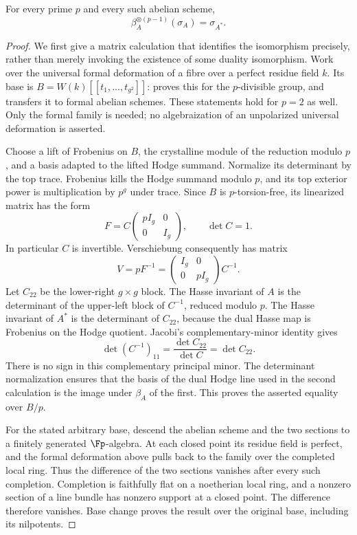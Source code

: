 \begin{theorem}\label{thm:DE-hasse}
For every prime $p$ and every such abelian scheme,
\[
                  \beta_A^{\otimes(p-1)}(\sigma_A)=\sigma_{A^*}.
\]
\end{theorem}
\begin{proof}
We first give a matrix calculation that identifies the isomorphism precisely, rather than merely invoking the existence of some duality isomorphism.  Work over the universal formal deformation of a fibre over a perfect residue field $k$.  Its base is
$B=W(k)[[t_1,\ldots,t_{g^2}]]$: \cite[Corollary~4.8(i)]{Illusie1985BT} proves this for the $p$-divisible group, and \cite[Theorem~1.2.1]{Katz1981ST} transfers it to formal abelian schemes.  These statements hold for $p=2$ as well.  Only the formal family is needed; no algebraization of an unpolarized universal deformation is asserted.

Choose a lift of Frobenius on $B$, the crystalline module of the reduction modulo $p$, and a basis adapted to the lifted Hodge summand.  Normalize its determinant by the top trace.  Frobenius kills the Hodge summand modulo $p$, and its top exterior power is multiplication by $p^g$ under trace.  Since $B$ is $p$-torsion-free, its linearized matrix has the form
\[
 F=C\begin{pmatrix}pI_g&0\\0&I_g\end{pmatrix},
 \qquad \det C=1.
\]
In particular $C$ is invertible.  Verschiebung consequently has matrix
\[
 V=pF^{-1}=\begin{pmatrix}I_g&0\\0&pI_g\end{pmatrix}C^{-1}.
\]
Let $C_{22}$ be the lower-right $g\times g$ block.  The Hasse invariant of $A$ is the determinant of the upper-left block of $C^{-1}$, reduced modulo $p$.  The Hasse invariant of $A^*$ is the determinant of $C_{22}$, because the dual Hasse map is Frobenius on the Hodge quotient.  Jacobi's complementary-minor identity gives
\[
             \det (C^{-1})_{11}=\frac{\det C_{22}}{\det C}
                             =\det C_{22}.
\]
There is no sign in this complementary principal minor.  The determinant normalization ensures that the basis of the dual Hodge line used in the second calculation is the image under $\beta_A$ of the first.  This proves the asserted equality over $B/p$.

For the stated arbitrary base, descend the abelian scheme and the two sections to a finitely generated $\Fp$-algebra.  At each closed point its residue field is perfect, and the formal deformation above pulls back to the family over the completed local ring.  Thus the difference of the two sections vanishes after every such completion.  Completion is faithfully flat on a noetherian local ring, and a nonzero section of a line bundle has nonzero support at a closed point.  The difference therefore vanishes.  Base change proves the result over the original base, including its nilpotents.
\end{proof}

